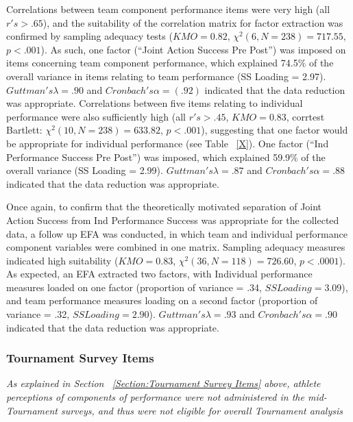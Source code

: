 Correlations between team component performance items were very high (all $r's > .65$), and the suitability of the correlation matrix for factor extraction was confirmed by sampling adequacy tests ($KMO = 0.82$, $\chi^2(6, N = 238) = 717.55$, $p < .001$).  As such, one factor (``Joint Action Success Pre Post'') was imposed on items concerning team component performance, which explained 74.5\% of the overall variance in items relating to team performance (SS Loading = 2.97). $Guttman's \lambda =.90$ and $Cronbach's \alpha = (.92)$ indicated that the data reduction was appropriate.  Correlations between five items relating to individual performance were also sufficiently high (all $r's > .45$, $KMO = 0.83$, corrtest Bartlett: $\chi^2(10, N = 238) = 633.82$, $p < .001$), suggesting that one factor would be appropriate for individual performance (see Table ~\ref{X}).  One factor (``Ind Performance Success Pre Post'') was imposed, which explained 59.9\% of the overall variance (SS Loading = 2.99).  $Guttman's\lambda =.87$ and $Cronbach's \alpha = .88$ indicated that the data reduction was appropriate.

Once again, to confirm that the theoretically motivated separation of Joint Action Success from Ind Performance Success was appropriate for the collected data, a follow up EFA was conducted, in which team and individual performance component variables were combined in one matrix. Sampling adequacy measures indicated high suitability ($KMO = 0.83$, $\chi^2(36, N = 118) = 726.60$, $p < .0001$).  As expected, an EFA extracted two factors, with Individual performance measures loaded on one factor (proportion of variance = .34, $SS Loading = 3.09$), and team performance measures loading on a second factor (proportion of variance = .32, $SS Loading = 2.90$). $Guttman's \lambda =.93$ and $Cronbach's \alpha = .90$ indicated that the data reduction was appropriate.


\subsubsection{Tournament Survey Items}

\textit{As explained in Section ~\ref{Section:Tournament Survey Items} above, athlete perceptions of components of performance were not administered in the mid-Tournament surveys, and thus were not eligible for overall Tournament analysis}


